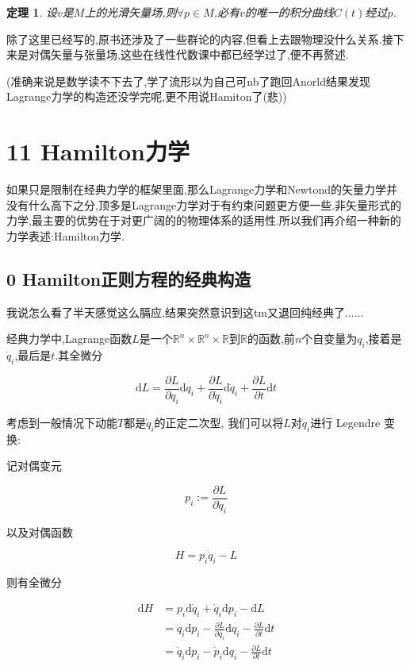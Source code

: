 \documentclass[UTF8]{article}
\newcommand{\D}{\mathrm{d}}
\begin{document}
	\newtheorem*{uniquenessOfIntegralCurve}{定理}
	
	\begin{uniquenessOfIntegralCurve}
		设$v$是$M$上的光滑矢量场,则$\forall p \in M$,必有$v$的唯一的积分曲线$C(t)$经过$p$.
	\end{uniquenessOfIntegralCurve}
	
	除了这里已经写的,原书还涉及了一些群论的内容,但看上去跟物理没什么关系.接下来是对偶矢量与张量场,这些在线性代数课中都已经学过了,便不再赘述.
	
	(准确来说是数学读不下去了,学了流形以为自己可nb了跑回Anorld结果发现Lagrange力学的构造还没学完呢,更不用说Hamiton了(悲))
	
	
	
	
	
	\newpage
	
	
\section*{11 Hamilton力学}
	
	如果只是限制在经典力学的框架里面,那么Lagrange力学和Newtond的矢量力学并没有什么高下之分,顶多是Lagrange力学对于有约束问题更方便一些.非矢量形式的力学,最主要的优势在于对更广阔的的物理体系的适用性.所以我们再介绍一种新的力学表述:Hamilton力学.
	
\subsection*{0 Hamilton正则方程的经典构造}
	
	我说怎么看了半天感觉这么膈应,结果突然意识到这tm又退回纯经典了......
	
	经典力学中,Lagrange函数$L$是一个$\mathbb{R}^n \times \mathbb{R}^n \times \mathbb{R}$到$\mathbb{R}$的函数,前$n$个自变量为$q_{i}$,接着是$\dot{q}_{i}$,最后是$t$.其全微分
	
	\[\D L = \frac{\partial L}{\partial q_{i}} \D q_{i} + \frac{\partial L}{\partial \dot{q}_{i}} \D \dot{q}_{i} + \frac{\partial L}{\partial t} \D t\]
	
	考虑到一般情况下动能$T$都是$\dot{q}_{i}$的正定二次型, 我们可以将$L$对$\dot{q}_{i}$进行 Legendre 变换:
	
	记对偶变元
	
	\[p_{i} := \frac{\partial L}{\partial \dot{q}_{i}}\]
	
	以及对偶函数
	
	\[H = p_{i}\dot{q}_{i} - L\]
	
	则有全微分
	
	\[\begin{aligned}
		\D H &= p_{i} \D \dot{q}_{i} + \dot{q}_{i} \D p_{i} - \D L\\
			 &= \dot{q}_{i} \D p_{i} - \frac{\partial L}{\partial q_{i}} \D q_{i} - \frac{\partial L}{\partial t} \D t\\
			 &= \dot{q}_{i} \D p_{i} - \dot{p}_{i} \D q_{i} - \frac{\partial L}{\partial t} \D t
	\end{aligned}\]
	
\end{document}
